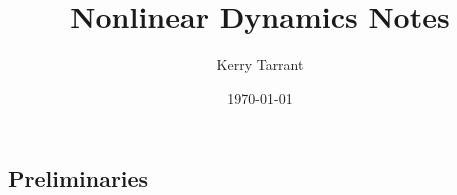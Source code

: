 \documentclass{book}
\title{Nonlinear Dynamics Notes}
\author{Kerry Tarrant}
\date\today
\begin{document}
\maketitle
\tableofcontents{}


\chapter{}

\section{Preliminaries}
\end{document}
